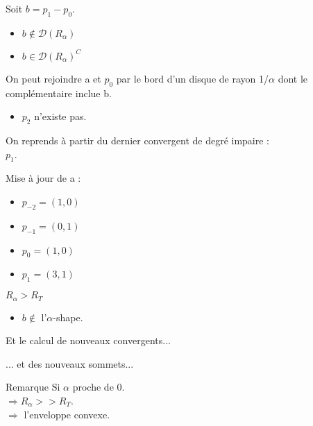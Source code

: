 \documentclass{beamer}
\begin{document}
\begin{frame}
\begin{columns}[t]
\begin{column}{3cm}
\begin{block}{}
{        }
        {
          Soit $b = p_{1} - p_{0}$.
          \begin{itemize}
            \item $b \notin \mathcal{D} \left( R_{\alpha} \right)$
            \item $b \in \mathcal{D} \left( R_{\alpha} \right)^C$
          \end{itemize}
          On peut rejoindre a et $p_0$ par le bord d'un disque de rayon 1/$\alpha$ dont le complémentaire inclue b.
        }        
        {
          \begin{itemize}
            \item $p_{2}$ n'existe pas.
          \end{itemize}
          On reprends à partir du dernier convergent de degré impaire :\\
          $p_1$.\\
        }
        {
          Mise à jour de a : \\
          \begin{itemize}
            \item $p_{-2} = (1, 0)$
            \item $p_{-1} = (0, 1)$
            \item $p_{0} = (1, 0)$
            \item $p_{1} = (3, 1)$
          \end{itemize}
        }
        {
          \alert{$R_{\alpha} > R_T$}\\
            \begin{itemize}
              \item $b \notin$ l'$\alpha$-shape.
            \end{itemize}
            Et le calcul de nouveaux convergents...
        }
        {
          ... et des nouveaux sommets...\\
        }
      \end{block}
      {
        \begin{block}{Remarque}
          \alert{Si $\alpha$ proche de 0.}\\
          \alert{$\Rightarrow R_{\alpha} >> R_T$.}\\
          \alert{$\Rightarrow$ l'enveloppe convexe.}\\

        \end{block}
      }     
    \end{column}
  \end{columns}

\end{frame}
\end{document}
